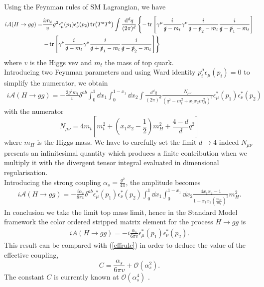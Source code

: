 Using the Feynman rules of SM Lagrangian, we have
\begin{align*}
	i\mathcal{A}(H\rightarrow gg)=&\frac{i m_t}{v}g^2 \epsilon_\mu^*(p_1) \epsilon_\nu^*(p_2) \tr(T^a T^b) \int \frac{\dd^d q}{(2\pi)^d}\left\{-\tr\left[\gamma^\mu \frac{i}{\slashed q-m_t}\gamma^\nu \frac{i}{\slashed q+\slashed p_2 -m_t}\frac{i}{\slashed q-\slashed p_1-m_t}\right]\right.\\
		&\left.-\tr\left[\gamma^\nu \frac{i}{\slashed q-m_t}\gamma^\mu \frac{i}{\slashed q+\slashed p_1-m_t}\frac{i}{\slashed q-\slashed p_2-m_t}\right]\right\}
\end{align*}
where $v$ is the Higgs vev and $m_t$ the mass of top quark.\\
Introducing two Feynman parameters and using Ward identity $p^\mu_i \epsilon_\mu(p_i)=0$ to simplify the numerator, we obtain 
\begin{align*}
	i\mathcal{A}(H\rightarrow gg)=-\frac{2g^2 m_t}{v} \delta^{ab} \int_0^1 \dd x_1 \int_0^{1-x_1} \dd x_2 \int \frac{\dd^d q}{(2\pi)^d} \frac{N_{\mu\nu}}{(q^2-m_t^2+x_1x_2 m_H^2)^3} \epsilon_\mu^*(p_1) \epsilon_\nu^*(p_2)
\end{align*}
with the numerator
$$
	N_{\mu\nu}=4 m_t \left[m_t^2+\left(x_1x_2-\frac{1}{2}\right)m_H^2+\frac{4-d}{d}q^2\right]
$$
where $m_H$ is the Higgs mass. We have to carefully set the limit $d\rightarrow 4$ indeed $N_{\mu\nu}$ presents an infinitesimal quantity which produces a finite contribution when we multiply it with the divergent tensor integral evaluated in dimensional regularisation.\\
Introducing the strong coupling $\alpha_s=\tfrac{g^2}{4\pi}$, the amplitude becomes 
\begin{align*}
i\mathcal{A}(H\rightarrow gg)=-\frac{i\alpha_s}{8\pi v}\delta^{ab} \epsilon_\mu^*(p_1) \epsilon_\nu^*(p_2) \int_0^1 \dd x_1 \int_0^{1-x_1} \dd x_2 \frac{4x_1 x_2 -1}{1-x_1x_2 \left(\frac{m_H}{m_t}\right)^2}m_H^2.
\end{align*}
In conclusion we take the limit top mass limit, hence in the Standard Model framework the color ordered stripped matrix element for the process $H\rightarrow gg$ is
\begin{align}
	iA(H\rightarrow gg)=-i \frac{\alpha_s}{6\pi v} \epsilon_\mu^*(p_1) \epsilon_\nu^*(p_2).
\end{align}
This result can be compared with (\ref{effrule}) in order to deduce the value of the effective coupling,
$$
	C=\frac{\alpha_s}{6\pi v}+\mathcal{O}(\alpha_s^2).
$$
The constant $C$ is currently known at $\mathcal{O}(\alpha_s^4)$ \cite{Chetyrkin:1997iv}.
